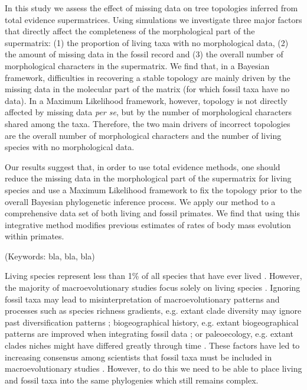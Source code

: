\documentclass[12pt,letterpaper]{article}
\begin{document}
In this study we assess the effect of missing data on tree topologies inferred from total evidence supermatrices. Using simulations we investigate three major factors that directly affect the completeness of the morphological part of the supermatrix: (1) the proportion of living taxa with no morphological data, (2) the amount of missing data in the fossil record and (3) the overall number of morphological characters in the supermatrix. We find that, in a Bayesian framework, difficulties in recovering a stable topology are mainly driven by the missing data in the molecular part of the matrix (for which fossil taxa have no data). In a Maximum Likelihood framework, however, topology is not directly affected by missing data \textit{per se}, but by the number of morphological characters shared among the taxa. Therefore, the two main drivers of incorrect topologies are the overall number of morphological characters and the number of living species with no morphological data.

Our results suggest that, in order to use total evidence methods, one should reduce the missing data in the morphological part of the supermatrix for living species and use a Maximum Likelihood framework to fix the topology prior to the overall Bayesian phylogenetic inference process. We apply our method to a comprehensive data set of both living and fossil primates. We find that using this integrative method modifies previous estimates of rates of body mass evolution within primates.

\noindent (Keywords: bla, bla, bla)\\

\vspace{1.5in}

\newpage 

Living species represent less than 1\% of all species that have ever lived \citep{novacek1992ext,raup1993extinction}. However, the majority of macroevolutionary studies focus solely on living species \citep{cooperwhat2009,meredithimpacts2011}.
Ignoring fossil taxa may lead to misinterpretation of macroevolutionary patterns and processes such as species richness gradients, e.g. extant clade diversity may ignore past diversification patterns \citep{shoshani1996proboscidea}; biogeographical history, e.g. extant biogeographical patterns are improved when integrating fossil data \citep{metcalfintegrating2014}; or paleoecology, e.g. extant clades niches might have differed greatly through time \citep{youngthe2010}. %
These factors have led to increasing consensus among scientists that fossil taxa must be included in macroevolutionary studies \citep{jacksonwhat2006,quentaldiversity2010,dietlconservation2011,slaterunifying2013,fritzdiversity2013}. However, to do this we need to be able to place living and fossil taxa into the same phylogenies which still remains complex.
\end{document}
